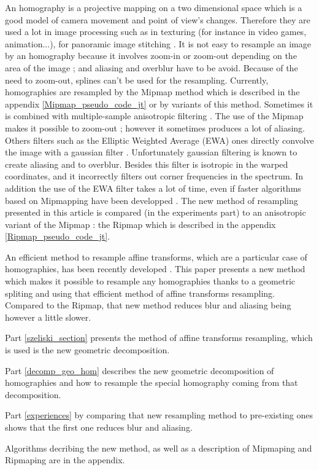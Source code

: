 
An homography is a projective mapping on a two dimensional space which is a good model of camera movement and point of view's changes. Therefore they are used a lot in image processing such as in texturing \cite{heckbert1983texture} (for instance in video games, animation...), for panoramic image stitching \cite{brown2007automatic}. It is not easy to resample an image by an homography because it involves zoom-in or zoom-out depending on the area of the image ; and aliasing and overblur have to be avoid. Because of the need to zoom-out, splines can't be used for the resampling. Currently, homographies are resampled by the Mipmap method \cite{williams1983pyramidal} which is described in the appendix \ref{Mipmap_pseudo_code_jt} or by variants of this method. Sometimes it is combined with multiple-sample anisotropic filtering  \cite{barkans1997high}. The use of the Mipmap makes it possible to zoom-out ; however it sometimes produces a lot of aliasing. Others filters such as the Elliptic Weighted Average (EWA) ones directly convolve the image with a gaussian filter \cite{greene1986creating}. Unfortunately gaussian filtering is known to create aliasing and to overblur. Besides this filter is isotropic in the warped coordinates, and it incorrectly filters out corner frequencies in the spectrum. In addition the use of the EWA filter takes a lot of time, even if faster algorithms based on Mipmapping have been developped \cite{mccormack1999feline,huttner1999fast}. The new method of resampling presented in this article is compared (in the experiments part) to an anisotropic variant of the Mipmap : the Ripmap \cite{akenine2008real} which is described in the appendix \ref{Ripmap_pseudo_code_jt}.

	An efficient method to resample affine transforms, which are a particular case of homographies, has been recently developed \cite{szeliski2010high}. This paper presents a new method which makes it possible to resample any homographies thanks to a geometric spliting and using that efficient method of affine transforms resampling. Compared to the Ripmap, that new method reduces blur and aliasing being however a little slower. 
	
	Part \ref{szeliski_section} presents the method of affine transforms resampling, which is used is the new geometric decomposition.
	
	Part \ref{decomp_geo_hom} describes the new geometric decomposition of homographies and how to resample the special homography coming from that decomposition.
	
	Part \ref{experiences} by comparing that new resampling method to pre-existing ones shows that the first one reduces blur and aliasing.
	
	Algorithms decribing the new method, as well as a description of Mipmaping and Ripmaping are in the appendix.
	
